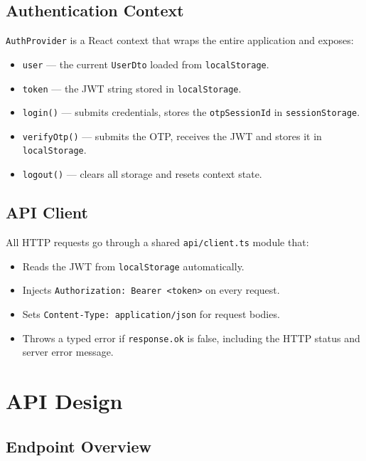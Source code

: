 \documentclass[12pt,a4paper]{report}
\begin{document}
\section{Authentication Context}

\texttt{AuthProvider} is a React context that wraps the entire application and exposes:

\begin{itemize}[noitemsep]
  \item \texttt{user} — the current \texttt{UserDto} loaded from \texttt{localStorage}.
  \item \texttt{token} — the JWT string stored in \texttt{localStorage}.
  \item \texttt{login()} — submits credentials, stores the \texttt{otpSessionId} in
        \texttt{sessionStorage}.
  \item \texttt{verifyOtp()} — submits the OTP, receives the JWT and stores it in
        \texttt{localStorage}.
  \item \texttt{logout()} — clears all storage and resets context state.
\end{itemize}

\section{API Client}

All HTTP requests go through a shared \texttt{api/client.ts} module that:
\begin{itemize}[noitemsep]
  \item Reads the JWT from \texttt{localStorage} automatically.
  \item Injects \texttt{Authorization: Bearer <token>} on every request.
  \item Sets \texttt{Content-Type: application/json} for request bodies.
  \item Throws a typed error if \texttt{response.ok} is false, including the HTTP
        status and server error message.
\end{itemize}

\chapter{API Design}
\label{ch:api}

\section{Endpoint Overview}
\end{document}
